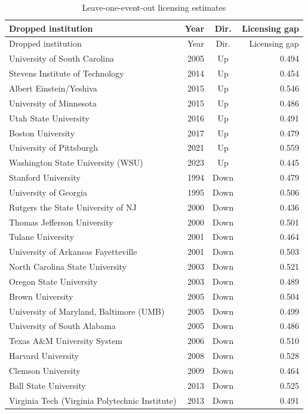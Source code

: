 {\footnotesize
\begin{longtable}{p{8.3cm}rcr}
\caption{Leave-one-event-out licensing estimates}\label{tab:loo}\\
\toprule
Dropped institution & Year & Dir. & Licensing gap \\\midrule
\endfirsthead
\toprule
Dropped institution & Year & Dir. & Licensing gap \\\midrule
\endhead
University of South Carolina & 2005 & Up & 0.494 \\
Stevens Institute of Technology & 2014 & Up & 0.454 \\
Albert Einstein/Yeshiva & 2015 & Up & 0.546 \\
University of Minnesota & 2015 & Up & 0.486 \\
Utah State University & 2016 & Up & 0.491 \\
Boston University & 2017 & Up & 0.479 \\
University of Pittsburgh & 2021 & Up & 0.559 \\
Washington State University (WSU) & 2023 & Up & 0.445 \\
Stanford University & 1994 & Down & 0.479 \\
University of Georgia & 1995 & Down & 0.506 \\
Rutgers the State University of NJ & 2000 & Down & 0.436 \\
Thomas Jefferson University & 2000 & Down & 0.501 \\
Tulane University & 2001 & Down & 0.464 \\
University of Arkansas Fayetteville & 2001 & Down & 0.503 \\
North Carolina State University & 2003 & Down & 0.521 \\
Oregon State University & 2003 & Down & 0.489 \\
Brown University & 2005 & Down & 0.504 \\
University of Maryland, Baltimore (UMB) & 2005 & Down & 0.499 \\
University of South Alabama & 2005 & Down & 0.486 \\
Texas A\&M University System & 2006 & Down & 0.510 \\
Harvard University & 2008 & Down & 0.528 \\
Clemson University & 2009 & Down & 0.464 \\
Ball State University & 2013 & Down & 0.525 \\
Virginia Tech (Virginia Polytechnic Institute) & 2013 & Down & 0.491 \\

\end{longtable}}
